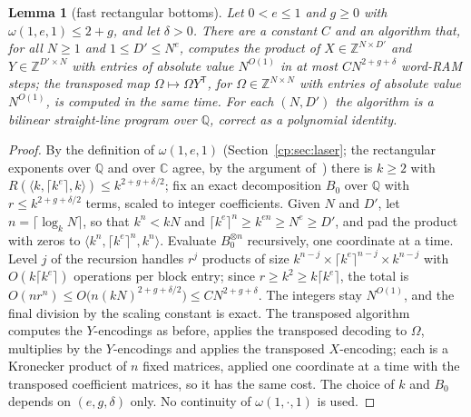 \documentclass[11pt]{article}
\newtheorem{lemma}[theorem]{Lemma}
\theoremstyle{definition}
\theoremstyle{remark}
\providecommand{\Z}{\mathbb{Z}}
\providecommand{\Q}{\mathbb{Q}}
\newcommand{\mat}[3]{\langle #1,#2,#3\rangle} %
\begin{document}
\begin{lemma}[fast rectangular bottoms]\label{cp:A10:bottom}
Let $0<e\le1$ and $g\ge0$ with $\omega(1,e,1)\le2+g$, and let $\delta>0$. There are a constant $C$ and an algorithm that, for all $N\ge1$ and $1\le D'\le N^e$, computes the product of $X\in\Z^{N\times D'}$ and $Y\in\Z^{D'\times N}$ with entries of absolute value $N^{O(1)}$ in at most $CN^{2+g+\delta}$ word-RAM steps; the transposed map $\Omega\mapsto\Omega Y^{\mathsf T}$, for $\Omega\in\Z^{N\times N}$ with entries of absolute value $N^{O(1)}$, is computed in the same time. For each $(N,D')$ the algorithm is a bilinear straight-line program over $\Q$, correct as a polynomial identity.
\end{lemma}

\begin{proof}
By the definition of $\omega(1,e,1)$ (Section~\ref{cp:sec:laser}; the rectangular exponents over $\Q$ and over $\mathbb C$ agree, by the argument of~\cite{Sch81}) there is $k\ge2$ with $R(\mat k{\lceil k^e\rceil}k)\le k^{2+g+\delta/2}$; fix an exact decomposition $B_0$ over $\Q$ with $r\le k^{2+g+\delta/2}$ terms, scaled to integer coefficients. Given $N$ and $D'$, let $n=\lceil\log_kN\rceil$, so that $k^n<kN$ and $\lceil k^e\rceil^n\ge k^{en}\ge N^e\ge D'$, and pad the product with zeros to $\mat{k^n}{\lceil k^e\rceil^n}{k^n}$. Evaluate $B_0^{\otimes n}$ recursively, one coordinate at a time. Level $j$ of the recursion handles $r^j$ products of size $k^{n-j}\times\lceil k^e\rceil^{n-j}\times k^{n-j}$ with $O(k\lceil k^e\rceil)$ operations per block entry; since $r\ge k^2\ge k\lceil k^e\rceil$, the total is $O(nr^n)\le O\bigl(n(kN)^{2+g+\delta/2}\bigr)\le CN^{2+g+\delta}$. The integers stay $N^{O(1)}$, and the final division by the scaling constant is exact. The transposed algorithm computes the $Y$-encodings as before, applies the transposed decoding to $\Omega$, multiplies by the $Y$-encodings and applies the transposed $X$-encoding; each is a Kronecker product of $n$ fixed matrices, applied one coordinate at a time with the transposed coefficient matrices, so it has the same cost. The choice of $k$ and $B_0$ depends on $(e,g,\delta)$ only. No continuity of $\omega(1,\cdot,1)$ is used.
\end{proof}
\end{document}
